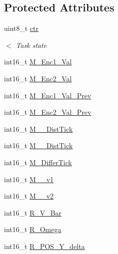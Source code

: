 \subsection*{Protected Attributes}
\begin{DoxyCompactItemize}
\item 
uint8\+\_\+t \mbox{\hyperlink{classtask__Robot__State_ae8b4b2e37c71d9042dae2c54e97c1d15}{ctr}}
\begin{DoxyCompactList}\small\item\em $<$ Task state \end{DoxyCompactList}\item 
int16\+\_\+t \mbox{\hyperlink{classtask__Robot__State_a092c78d5576e35801925eeecbb97a79c}{M\+\_\+\+Enc1\+\_\+\+Val}}
\item 
int16\+\_\+t \mbox{\hyperlink{classtask__Robot__State_a2640c6452587cfa91b5d39300d3a8787}{M\+\_\+\+Enc2\+\_\+\+Val}}
\item 
int16\+\_\+t \mbox{\hyperlink{classtask__Robot__State_adf70382c5609156dd09feec7b7388d3e}{M\+\_\+\+Enc1\+\_\+\+Val\+\_\+\+Prev}}
\item 
int16\+\_\+t \mbox{\hyperlink{classtask__Robot__State_ae481e2fefc30635af5d87502359b5f27}{M\+\_\+\+Enc2\+\_\+\+Val\+\_\+\+Prev}}
\item 
int16\+\_\+t \mbox{\hyperlink{classtask__Robot__State_a6a8e5da800f8216ee2f2b21b42bee0ac}{M\+\_\+\_\+\+Dist\+Tick}}
\item 
int16\+\_\+t \mbox{\hyperlink{classtask__Robot__State_a3ac7b27f5ece3ac296d633fbbb2f3bcf}{M\+\_\+\_\+\+Dist\+Tick}}
\item 
int16\+\_\+t \mbox{\hyperlink{classtask__Robot__State_ac733000c82a9193c73ccaf8c08b4b458}{M\+\_\+\+Differ\+Tick}}
\item 
int16\+\_\+t \mbox{\hyperlink{classtask__Robot__State_a3b0b9b6502fa801ce8b51060e11df221}{M\+\_\+\_\+v1}}
\item 
int16\+\_\+t \mbox{\hyperlink{classtask__Robot__State_a8dbb550d455d7b46fffe62f88ac2803a}{M\+\_\+\_\+v2}}
\item 
int16\+\_\+t \mbox{\hyperlink{classtask__Robot__State_ab7e56e05e5a537e83dbf7808e5909f8a}{R\+\_\+\+V\+\_\+\+Bar}}
\item 
int16\+\_\+t \mbox{\hyperlink{classtask__Robot__State_a91536d049096dae66a1430d90450679f}{R\+\_\+\+Omega}}
\item 
int16\+\_\+t \mbox{\hyperlink{classtask__Robot__State_a13fa329e0d89c610202a190450d717ec}{R\+\_\+\+P\+O\+S\+\_\+\+Y\+\_\+delta}}
\item 

\end{DoxyCompactItemize}
